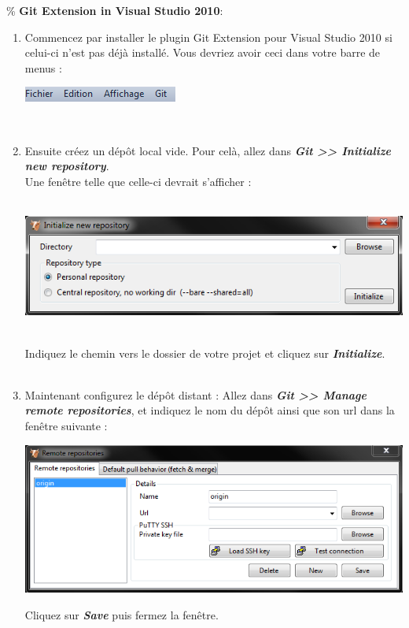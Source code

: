 \documentclass[a4paper]{article}
\begin{document}
\% \textbf{Git Extension in Visual Studio 2010}:\\
\begin{enumerate}
    \item Commencez par installer le plugin Git Extension pour Visual Studio 2010 si
celui-ci n'est pas d\'ejà install\'e. Vous devriez avoir ceci dans votre barre
de menus :
\begin{center}
    \includegraphics{img/VS_git.png}
\end{center}
\\
    \item Ensuite cr\'eez un d\'epôt local vide. Pour celà, allez dans
	\textbf{\emph{Git
	>> Initialize new repository}}. \\
Une fenêtre telle que celle-ci devrait s'afficher :\\ 
\\

\begin{center}
    \includegraphics{img/VS_new_repo.png}\\ 
\end{center}
\\
Indiquez le chemin vers le dossier de votre projet et cliquez sur
\textbf{\emph{Initialize}}.\\
\\ 
    \item Maintenant configurez le d\'epôt distant : Allez dans \textbf{\emph{Git >>
	Manage remote repositories}}, et indiquez le nom du d\'epôt ainsi que
	son url dans la fenêtre suivante : \\
    \begin{center}
	\includegraphics[scale=0.85]{img/VS_manage_remote.png} \\
    \end{center}
    Cliquez sur \textbf{\emph{Save}} puis fermez la fenêtre. \\
    \\
 

\end{enumerate}
\end{document}
